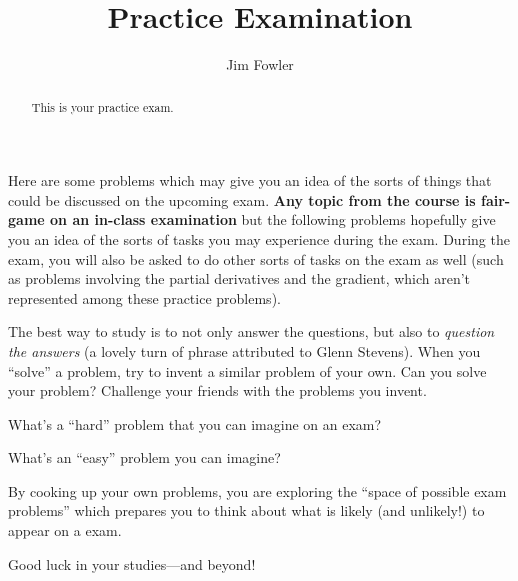 \documentclass{ximera}
\author{Jim Fowler}
\title{Practice Examination}
\begin{document}
\begin{abstract}
  This is your practice exam.
\end{abstract}
\maketitle

Here are some problems which may give you an idea of the sorts of
things that could be discussed on the upcoming exam.  \textbf{Any
  topic from the course is fair-game on an in-class examination} but
the following problems hopefully give you an idea of the sorts of
tasks you may experience during the exam.  During the exam, you
will also be asked to do other sorts of tasks on the exam as well
(such as problems involving the partial derivatives and the gradient,
which aren't represented among these practice problems).

The best way to study is to not only answer the questions, but also to
\textit{question the answers} (a lovely turn of phrase attributed to
Glenn Stevens).  When you ``solve'' a problem, try to invent a similar
problem of your own.  Can you solve your problem?  Challenge your
friends with the problems you invent.

What's a ``hard'' problem that you can imagine on an exam?
\begin{freeResponse}
\end{freeResponse}

What's an ``easy'' problem you can imagine?
\begin{freeResponse}
\end{freeResponse}

By cooking up your own problems, you are exploring the ``space of
possible exam problems'' which prepares you to think about what is
likely (and unlikely!) to appear on a exam.

Good luck in your studies---and beyond!
\end{document}
